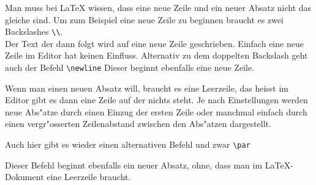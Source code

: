 \documentclass[10pt]{article}
\begin{document}
\linespread{2}\selectfont
\blindtext

\linespread{1}\selectfont
Man muss bei LaTeX wissen, dass eine neue Zeile und ein neuer Absatz nicht das gleiche sind. Um zum Beispiel eine neue Zeile zu beginnen braucht es zwei Backslashes \texttt{\textbackslash\textbackslash}.\\ Der Text der dann folgt wird auf eine neue Zeile geschrieben.
Einfach eine neue Zeile im Editor hat keinen Einfluss. Alternativ zu dem doppelten Backslash geht auch der Befehl \verb+\newline+ \newline Dieser beginnt ebenfalls eine neue Zeile.

Wenn man einen neuen Absatz will, braucht es eine Leerzeile, das heisst im Editor gibt es dann eine Zeile auf der nichts steht. Je nach Einstellungen werden neue Abs"atze durch einen Einzug der ersten Zeile oder manchmal einfach durch einen vergr"osserten Zeilenabstand zwischen den Abs"atzen dargestellt.

Auch hier gibt es wieder einen alternativen Befehl und zwar \verb+\par+ \par Dieser Befehl beginnt ebenfalls ein neuer Absatz, ohne, dass man im \LaTeX-Dokument eine Leerzeile braucht.
\end{document}
